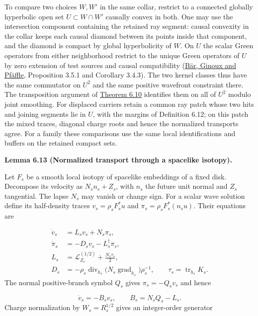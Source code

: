 \documentclass[
  english,
  11pt,
  reqno]{amsart}
\makeatletter
\newcommand{\pandocstatementheading}[1]{%
  \par\addpenalty{\@beginparpenalty}%
  \addvspace{.5\baselineskip plus .2\baselineskip minus .2\baselineskip}%
  {\normalfont\bfseries #1\par}%
  \nobreak\@afterindenttrue\@afterheading
}
\makeatother
\begin{document}
To compare two choices \(W,W'\) in the same collar, restrict to a
connected globally hyperbolic open set \(U\subset W\cap W'\) causally
convex in both. One may use the intersection component containing the
retained ray segment: causal convexity in the collar keeps each causal
diamond between its points inside that component, and the diamond is
compact by global hyperbolicity of \(W\). On \(U\) the scalar Green
operators from either neighborhood restrict to the unique Green
operators of \(U\) by zero extension of test sources and causal
compatibility (\hyperref[ref-BarGinouxPfaffle2007]{Bär, Ginoux and
Pfäffle}, Proposition 3.5.1 and Corollary 3.4.3). The two kernel classes
thus have the same commutator on \(U^2\) and the same positive wavefront
constraint there. The transposition argument of
\hyperref[thm:online-canonical-wave-kernel]{Theorem 6.10} identifies
them on all of \(U^2\) modulo joint smoothing. For displaced carriers
retain a common ray patch whose two hits and joining segments lie in
\(U\), with the margins of Definition 6.12; on this patch the mixed
traces, diagonal charge roots and hence the normalized transports agree.
For a family these comparisons use the same local identifications and
buffers on the retained compact sets.

\pandocstatementheading{\leavevmode{}\label{lem:online-wave-spacelike-transport}Lemma 6.13 (Normalized transport through a spacelike isotopy).}

Let \(F_s\) be a smooth local isotopy of spacelike embeddings of a fixed
disk. Decompose its velocity as \(N_sn_s+Z_s\), with \(n_s\) the future
unit normal and \(Z_s\) tangential. The lapse \(N_s\) may vanish or
change sign. For a scalar wave solution define its half-density traces
\(v_s=\rho_sF_s^*u\) and \(\pi_s=\rho_sF_s^*(n_su)\). Their equations
are

\label{eq:online-wave-spacelike-hamiltonian-system} \[
\begin{aligned}
\dot v_s&=L_sv_s+N_s\pi_s,\\
\dot\pi_s&=-D_sv_s-L_s^\dagger\pi_s,\\
L_s&=\mathcal L_{Z_s}^{(1/2)}+\frac{N_s\tau_s}{2},\\
D_s&=-\rho_s\operatorname{div}_{h_s}
       \bigl(N_s\operatorname{grad}_{h_s}\bigr)\rho_s^{-1},
\qquad \tau_s=\operatorname{tr}_{h_s}K_s.
\end{aligned}
\] The normal positive-branch symbol \(Q_s\) gives \(\pi_s=-Q_sv_s\) and
hence

\label{eq:online-wave-spacelike-trace-generator} \[
\dot v_s=-B_sv_s,\qquad B_s=N_sQ_s-L_s.
\] Charge normalization by \(W_s=R_s^{1/2}\) gives an integer-order
generator
\end{document}
